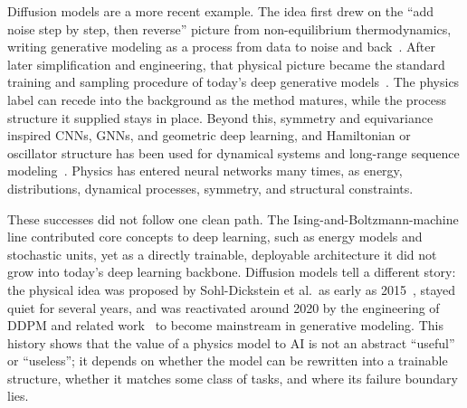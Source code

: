 \documentclass[11pt]{article}
\theoremstyle{definition}
\theoremstyle{plain}
\begin{document}
Diffusion models are a more recent example. The idea first drew on the ``add noise step by
step, then reverse'' picture from non-equilibrium thermodynamics, writing generative modeling
as a process from data to noise and back~\citep{sohldickstein2015deep}. After later
simplification and engineering, that physical picture became the standard training and
sampling procedure of today's deep generative models~\citep{ho2020denoising}. The physics
label can recede into the background as the method matures, while the process structure it
supplied stays in place. Beyond this, symmetry and equivariance inspired CNNs, GNNs, and
geometric deep learning, and Hamiltonian or oscillator structure has been used for dynamical
systems and long-range sequence
modeling~\citep{bronstein2021geometric,greydanus2019hamiltonian,rusch2021coupled,rusch2024oscillatory}.
Physics has entered neural networks many times, as energy, distributions, dynamical
processes, symmetry, and structural constraints.

These successes did not follow one clean path. The Ising-and-Boltzmann-machine line
contributed core concepts to deep learning, such as energy models and stochastic units, yet
as a directly trainable, deployable architecture it did not grow into today's deep learning
backbone. Diffusion models tell a different story: the physical idea was proposed by
Sohl-Dickstein et al.\ as early as 2015~\citep{sohldickstein2015deep}, stayed quiet for
several years, and was reactivated around 2020 by the engineering of DDPM and related
work~\citep{ho2020denoising} to become mainstream in generative modeling. This history shows
that the value of a physics model to AI is not an abstract ``useful'' or ``useless''; it
depends on whether the model can be rewritten into a trainable structure, whether it matches
some class of tasks, and where its failure boundary lies.
\end{document}
